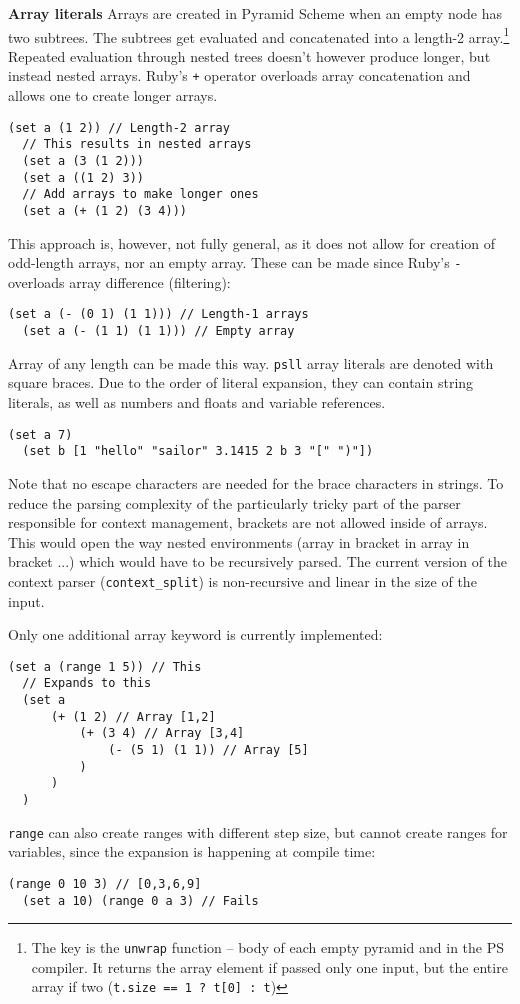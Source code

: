 \documentclass[aip,jcp,reprint,footinbib]{revtex4-1}
\let\tt\texttt
\newcommand\psll{\texttt{psll}\xspace}
\begin{document}
\textbf{Array literals} Arrays are created in Pyramid Scheme when an empty node has two subtrees. The subtrees get evaluated and concatenated into a length-2 array.\footnote{The key is the \tt{unwrap} function -- body of each empty pyramid and in the PS compiler. It returns the array element if passed only one input, but the entire array if two (\tt{t.size == 1 ? t[0] : t})} Repeated evaluation through nested trees doesn't however produce longer, but instead nested arrays. Ruby's \tt{+} operator overloads array concatenation and allows one to create longer arrays.
\begin{lstlisting}[language=psll,aboveskip=3pt,belowskip=-2pt,frame=none,numbers=none]
  (set a (1 2)) // Length-2 array
  // This results in nested arrays
  (set a (3 (1 2)))
  (set a ((1 2) 3))
  // Add arrays to make longer ones
  (set a (+ (1 2) (3 4)))
\end{lstlisting}
This approach is, however, not fully general, as it does not allow for creation of odd-length arrays, nor an empty array. These can be made since Ruby's \tt{-} overloads array difference (filtering):
\begin{lstlisting}[language=psll,aboveskip=3pt,belowskip=-2pt,frame=none,numbers=none]
  (set a (- (0 1) (1 1))) // Length-1 arrays
  (set a (- (1 1) (1 1))) // Empty array
\end{lstlisting}
Array of any length can be made this way. \psll array literals are denoted with square braces. Due to the order of literal expansion, they can contain string literals, as well as numbers and floats and variable references.
\begin{lstlisting}[language=psll,aboveskip=3pt,belowskip=-2pt,frame=none,numbers=none]
  (set a 7)
  (set b [1 "hello" "sailor" 3.1415 2 b 3 "[" ")"])
\end{lstlisting}
Note that no escape characters are needed for the brace characters in strings. To reduce the parsing complexity of the particularly tricky part of the parser responsible for context management, brackets are not allowed inside of arrays. This would open the way nested environments (array in bracket in array in bracket ...) which would have to be recursively parsed. The current version of the context parser (\tt{context\_split}) is non-recursive and linear in the size of the input.

Only one additional array keyword is currently implemented:
\begin{lstlisting}[language=psll,aboveskip=3pt,belowskip=-2pt,frame=none,numbers=none]
  (set a (range 1 5)) // This
  // Expands to this
  (set a
      (+ (1 2) // Array [1,2]
          (+ (3 4) // Array [3,4]
              (- (5 1) (1 1)) // Array [5]
          )
      )
  )
\end{lstlisting}
\tt{range} can also create ranges with different step size, but cannot create ranges for variables, since the expansion is happening at compile time:
\begin{lstlisting}[language=psll,aboveskip=3pt,belowskip=-2pt,frame=none,numbers=none]
  (range 0 10 3) // [0,3,6,9]
  (set a 10) (range 0 a 3) // Fails
\end{lstlisting}
\end{document}
